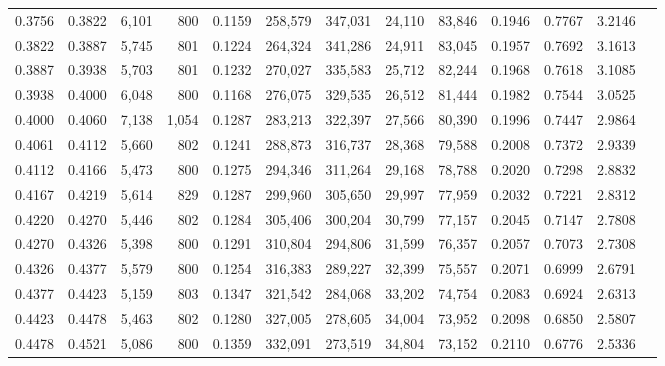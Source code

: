 \begin{tabular}{rrrrrrrrrrrrr}
0.3756 & 0.3822 &  6,101 &   800 &                                     0.1159 & 258,579 & 347,031 &  24,110 &  83,846 & 0.1946 & 0.7767 & 3.2146 \\
0.3822 & 0.3887 &  5,745 &   801 &                                     0.1224 & 264,324 & 341,286 &  24,911 &  83,045 & 0.1957 & 0.7692 & 3.1613 \\
0.3887 & 0.3938 &  5,703 &   801 &                                     0.1232 & 270,027 & 335,583 &  25,712 &  82,244 & 0.1968 & 0.7618 & 3.1085 \\
0.3938 & 0.4000 &  6,048 &   800 &                                     0.1168 & 276,075 & 329,535 &  26,512 &  81,444 & 0.1982 & 0.7544 & 3.0525 \\
0.4000 & 0.4060 &  7,138 & 1,054 &                                     0.1287 & 283,213 & 322,397 &  27,566 &  80,390 & 0.1996 & 0.7447 & 2.9864 \\
0.4061 & 0.4112 &  5,660 &   802 &                                     0.1241 & 288,873 & 316,737 &  28,368 &  79,588 & 0.2008 & 0.7372 & 2.9339 \\
0.4112 & 0.4166 &  5,473 &   800 &                                     0.1275 & 294,346 & 311,264 &  29,168 &  78,788 & 0.2020 & 0.7298 & 2.8832 \\
0.4167 & 0.4219 &  5,614 &   829 &                                     0.1287 & 299,960 & 305,650 &  29,997 &  77,959 & 0.2032 & 0.7221 & 2.8312 \\
0.4220 & 0.4270 &  5,446 &   802 &                                     0.1284 & 305,406 & 300,204 &  30,799 &  77,157 & 0.2045 & 0.7147 & 2.7808 \\
0.4270 & 0.4326 &  5,398 &   800 &                                     0.1291 & 310,804 & 294,806 &  31,599 &  76,357 & 0.2057 & 0.7073 & 2.7308 \\
0.4326 & 0.4377 &  5,579 &   800 &                                     0.1254 & 316,383 & 289,227 &  32,399 &  75,557 & 0.2071 & 0.6999 & 2.6791 \\
0.4377 & 0.4423 &  5,159 &   803 &                                     0.1347 & 321,542 & 284,068 &  33,202 &  74,754 & 0.2083 & 0.6924 & 2.6313 \\
0.4423 & 0.4478 &  5,463 &   802 &                                     0.1280 & 327,005 & 278,605 &  34,004 &  73,952 & 0.2098 & 0.6850 & 2.5807 \\
0.4478 & 0.4521 &  5,086 &   800 &                                     0.1359 & 332,091 & 273,519 &  34,804 &  73,152 & 0.2110 & 0.6776 & 2.5336 \\

\end{tabular}
